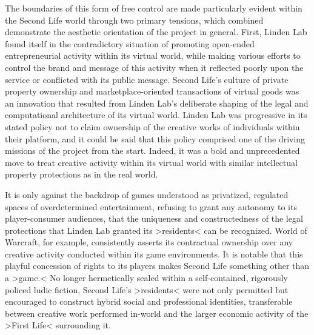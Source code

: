 The boundaries of this form of free control are made particularly evident within the Second Life world through two primary tensions, which combined demonstrate the aesthetic orientation of the project in general. First, Linden Lab found itself in the contradictory situation of promoting open-ended entrepreneurial activity within its virtual world, while making various efforts to control the brand and message of this activity when it reflected poorly upon the service or conflicted with its public message. Second Life's culture of private property ownership and marketplace-oriented transactions of virtual goods was an innovation that resulted from Linden Lab's deliberate shaping of the legal and computational architecture of its virtual world. Linden Lab was progressive in its stated policy not to claim ownership of the creative works of individuals within their platform, and it could be said that this policy comprised one of the driving missions of the project from the start. Indeed, it was a bold and unprecedented move to treat creative activity within its virtual world with similar intellectual property protections as in the real world.

It is only against the backdrop of games understood as privatized, regulated spaces of overdetermined entertainment, refusing to grant any autonomy to its player-consumer audiences, that the uniqueness and constructedness of the legal protections that Linden Lab granted its >residents< can be recognized. World of Warcraft, for example, consistently asserts its contractual ownership over any creative activity conducted within its game environments. It is notable that this playful concession of rights to its players makes Second Life something other than a >game.< No longer hermetically sealed within a self-contained, rigorously policed ludic fiction, Second Life's >residents< were not only permitted but encouraged to construct hybrid social and professional identities, transferable between creative work performed in-world and the larger economic activity of the >First Life< surrounding it.

